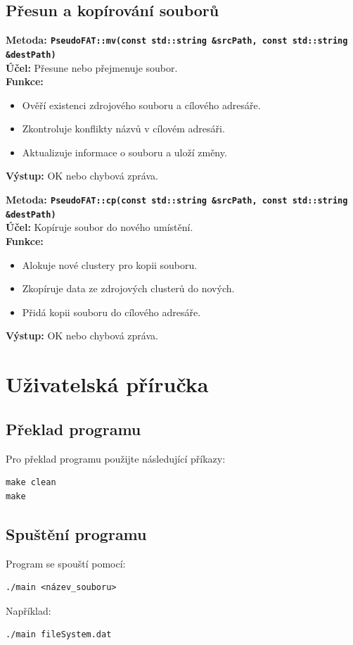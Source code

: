 \documentclass[12pt, a4paper]{article}
\begin{document}
\subsection{Přesun a kopírování souborů}
\textbf{Metoda: \texttt{PseudoFAT::mv(const std::string \&srcPath, const std::string \&destPath)}} \\
\textbf{Účel:} Přesune nebo přejmenuje soubor. \\
\textbf{Funkce:}
\begin{itemize}
    \item Ověří existenci zdrojového souboru a cílového adresáře.
    \item Zkontroluje konflikty názvů v cílovém adresáři.
    \item Aktualizuje informace o souboru a uloží změny.
\end{itemize}
\textbf{Výstup:} OK nebo chybová zpráva.

\textbf{Metoda: \texttt{PseudoFAT::cp(const std::string \&srcPath, const std::string \&destPath)}} \\
\textbf{Účel:} Kopíruje soubor do nového umístění. \\
\textbf{Funkce:}
\begin{itemize}
    \item Alokuje nové clustery pro kopii souboru.
    \item Zkopíruje data ze zdrojových clusterů do nových.
    \item Přidá kopii souboru do cílového adresáře.
\end{itemize}
\textbf{Výstup:} OK nebo chybová zpráva.


\section{Uživatelská příručka}

\subsection{Překlad programu}
Pro překlad programu použijte následující příkazy:
\begin{verbatim}
make clean
make
\end{verbatim}

\subsection{Spuštění programu}
Program se spouští pomocí:
\begin{verbatim}
./main <název_souboru>
\end{verbatim}
Například:
\begin{verbatim}
./main fileSystem.dat
\end{verbatim}
\end{document}
